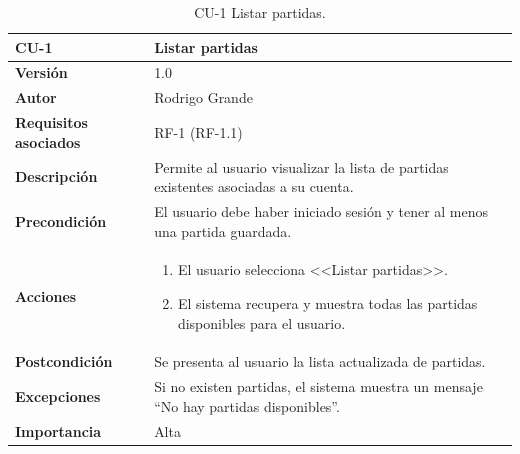 \begin{table}[p]
	\centering
	\begin{tabularx}{\linewidth}{ p{} p{} }
		\toprule
		\textbf{CU-1} & \textbf{Listar partidas}\\
		\toprule
		\textbf{Versión}              & 1.0    \\
		\textbf{Autor}                & Rodrigo Grande \\
		\textbf{Requisitos asociados} & RF-1 (RF-1.1) \\
		\textbf{Descripción}          & Permite al usuario visualizar la lista de partidas existentes asociadas a su cuenta.\\
		\textbf{Precondición}         & El usuario debe haber iniciado sesión y tener al menos una partida guardada. \\
		\textbf{Acciones}             &
		\begin{enumerate}
			\def\labelenumi{\arabic{enumi}.}
			\tightlist
			\item El usuario selecciona <<Listar partidas>>.
			\item El sistema recupera y muestra todas las partidas disponibles para el usuario.
		\end{enumerate}\\
		\textbf{Postcondición}        & Se presenta al usuario la lista actualizada de partidas. \\
		\textbf{Excepciones}          & Si no existen partidas, el sistema muestra un mensaje “No hay partidas disponibles”. \\
		\textbf{Importancia}          & Alta \\
		\bottomrule
	\end{tabularx}
	\caption{CU-1 Listar partidas.}
	\label{cu:listar-partidas}
\end{table}

